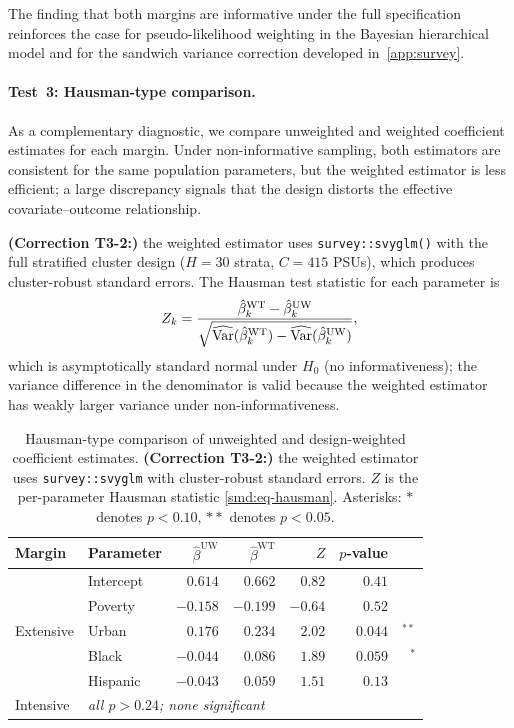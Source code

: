 The finding that both margins are informative under the full
specification reinforces the case for pseudo-likelihood weighting in the
Bayesian hierarchical model and for the sandwich variance correction
developed in~\cref{app:survey}.

\paragraph{Test~3: Hausman-type comparison.}
As a complementary diagnostic, we compare unweighted and weighted
coefficient estimates for each margin.  Under non-informative sampling,
both estimators are consistent for the same population parameters, but
the weighted estimator is less efficient; a large discrepancy signals
that the design distorts the effective covariate--outcome relationship.

{\upshape\textbf{(Correction T3-2:)}} the weighted estimator uses
\texttt{survey::svyglm()} with the full stratified cluster design ($H =
30$ strata, $C = 415$ PSUs), which produces cluster-robust standard
errors.  The Hausman test statistic for each parameter is
\begin{equation}\label{smd:eq-hausman}
  Z_k = \frac{\hat{\beta}_k^{\mathrm{WT}} -
    \hat{\beta}_k^{\mathrm{UW}}}
  {\sqrt{\widehat{\operatorname*{Var}}(\hat{\beta}_k^{\mathrm{WT}}) -
    \widehat{\operatorname*{Var}}(\hat{\beta}_k^{\mathrm{UW}})}},
\end{equation}
which is asymptotically standard normal under $H_0$ (no
informativeness); the variance difference in the denominator is valid
because the weighted estimator has weakly larger variance under
non-informativeness.

\begin{table}[htbp]
  \centering
  \caption{Hausman-type comparison of unweighted and
    design-weighted coefficient estimates.
    {\upshape\textbf{(Correction T3-2:)}} the weighted estimator uses
    \texttt{survey::svyglm} with cluster-robust standard errors.
    $Z$ is the per-parameter Hausman statistic
    \eqref{smd:eq-hausman}.  Asterisks: ${*}$ denotes $p < 0.10$,
    ${**}$ denotes $p < 0.05$.}
  \label{smd:tab-hausman}
  \smallskip
  \begin{tabular}{llrrrrr}
    \toprule
    Margin & Parameter
      & $\hat{\beta}^{\mathrm{UW}}$ & $\hat{\beta}^{\mathrm{WT}}$
      & $Z$ & $p$-value & \\
    \midrule
    \multirow{5}{*}{Extensive}
      & Intercept & $0.614$  & $0.662$  & $0.82$  & $0.41$ & \\
      & Poverty   & $-0.158$ & $-0.199$ & $-0.64$ & $0.52$ & \\
      & Urban     & $0.176$  & $0.234$  & $2.02$  & $0.044$ & $^{**}$ \\
      & Black     & $-0.044$ & $0.086$  & $1.89$  & $0.059$ & $^{*}$ \\
      & Hispanic  & $-0.043$ & $0.059$  & $1.51$  & $0.13$ & \\[4pt]
    Intensive
      & \multicolumn{5}{l}{\emph{all $p > 0.24$; none significant}} & \\
    \bottomrule
  \end{tabular}
\end{table}

